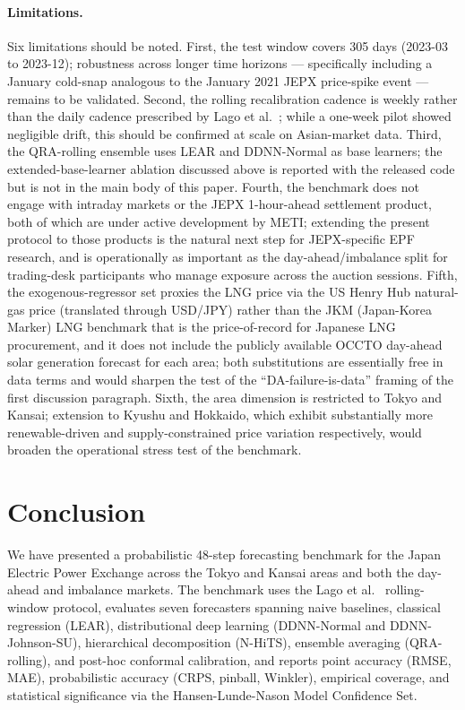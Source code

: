 \documentclass[review,3p,times,authoryear]{elsarticle}
\begin{document}
\paragraph{Limitations.}
Six limitations should be noted. First, the test window covers 305 days (2023-03 to 2023-12); robustness across longer time horizons --- specifically including a January cold-snap analogous to the January 2021 JEPX price-spike event --- remains to be validated. Second, the rolling recalibration cadence is weekly rather than the daily cadence prescribed by Lago et al.\ \citep{lago2021}; while a one-week pilot showed negligible drift, this should be confirmed at scale on Asian-market data. Third, the QRA-rolling ensemble uses LEAR and DDNN-Normal as base learners; the extended-base-learner ablation discussed above is reported with the released code but is not in the main body of this paper. Fourth, the benchmark does not engage with intraday markets or the JEPX 1-hour-ahead settlement product, both of which are under active development by METI; extending the present protocol to those products is the natural next step for JEPX-specific EPF research, and is operationally as important as the day-ahead/imbalance split for trading-desk participants who manage exposure across the auction sessions. Fifth, the exogenous-regressor set proxies the LNG price via the US Henry Hub natural-gas price (translated through USD/JPY) rather than the JKM (Japan-Korea Marker) LNG benchmark that is the price-of-record for Japanese LNG procurement, and it does not include the publicly available OCCTO day-ahead solar generation forecast for each area; both substitutions are essentially free in data terms and would sharpen the test of the ``DA-failure-is-data'' framing of the first discussion paragraph. Sixth, the area dimension is restricted to Tokyo and Kansai; extension to Kyushu and Hokkaido, which exhibit substantially more renewable-driven and supply-constrained price variation respectively, would broaden the operational stress test of the benchmark.

\section{Conclusion}\label{sec:conclusion}

We have presented a probabilistic 48-step forecasting benchmark for the Japan Electric Power Exchange across the Tokyo and Kansai areas and both the day-ahead and imbalance markets. The benchmark uses the Lago et al.\ \citep{lago2021} rolling-window protocol, evaluates seven forecasters spanning naive baselines, classical regression (LEAR), distributional deep learning (DDNN-Normal and DDNN-Johnson-SU), hierarchical decomposition (N-HiTS), ensemble averaging (QRA-rolling), and post-hoc conformal calibration, and reports point accuracy (RMSE, MAE), probabilistic accuracy (CRPS, pinball, Winkler), empirical coverage, and statistical significance via the Hansen-Lunde-Nason Model Confidence Set.
\end{document}
